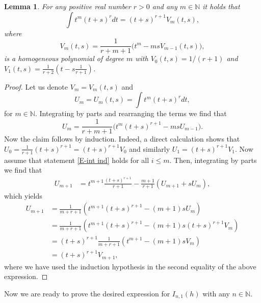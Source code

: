 \documentclass[12pt,psamsfonts]{amsart}
\newtheorem {lemma}  [theorem]{Lemma}
\begin{document}
\begin{lemma}
\label{L-integral indu} For any positive real number $r> 0$ and any
$m\in{\mathbb{N}}$ it holds that
    \begin{equation}
    \label{E-int ind}
         \int t^m(t+s)^r dt=(t+s)^{r+1} V_m(t,s),
     \end{equation} where
    \begin{equation*}
        V_m(t,s)=\frac{1}{r+m+1} \Big( t^m - m s V_{m-1}(t,s)\Big),
    \end{equation*}
   is a homogeneous polynomial of degree $m$ with $V_0(t,s)={1}/{(r+1)}$ and
    $V_1(t,s)=\frac{1}{r+2}\left (t - s \frac{1}{r+1}\right)$.
\end{lemma}

\begin{proof}
Let us denote  $V_m=V_m(t,s)$ and
    \begin{equation*}
        U_m=U_m(t,s)=\int t^m(t+s)^r dt,
    \end{equation*}
for $m\in{\mathbb{N}}$. Integrating by parts and rearranging the terms we find
that
\begin{equation*}
    U_m =\frac{1}{r+m+1}\Big(t^m(t+s)^{r+1} - m s U_{m-1}\Big).
\end{equation*}
Now the claim follows by induction. Indeed, a direct calculation
shows  that $U_0=\frac{1}{r+1} (t+s)^{r+1}= (t+s)^{r+1} V_0$  and
similarly $U_1= (t+s)^{r+1} V_1$. Now assume that statement
\eqref{E-int ind} holds for all $i\leq m$. Then, integrating by
parts we find that
\begin{align*}
    U_{m+1} 
                &= t^{m+1}\frac{(t+s)^{r+1}}{r+1} - \frac{m+1}{r+1}\left(U_{m+1} + s U_m\right),
\end{align*}
which yields
\begin{align*}
    U_{m+1} &= \frac{1}{m+r+1}\left(t^{m+1} (t+s)^{r+1} - (m+1) s U_m\right)\\
                &= \frac{1}{m+r+1}\left(t^{m+1} (t+s)^{r+1} - (m+1) s (t+s)^{r+1} V_m\right)\\
                &= (t+s)^{r+1}\frac{1}{m+r+1}\left(t^{m+1}  - (m+1) s  V_m\right)\\
                &= (t+s)^{r+1}V_{m+1},
\end{align*}
where we have used the induction hypothesis in the second equality
of the above expression.
\end{proof}

Now we are ready to prove the desired expression for $I_{n,1}(h)$ with any
$n\in{\mathbb{N}}$.
\end{document}
